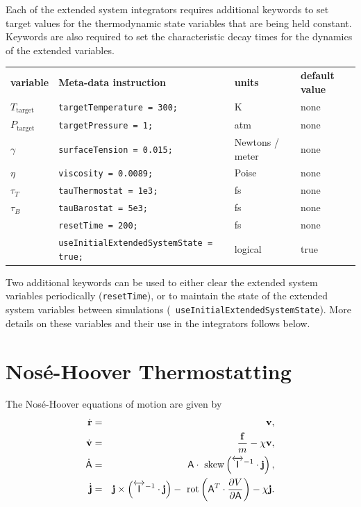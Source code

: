 \documentclass[letterpaper]{report}
\begin{document}
Each of the extended system integrators requires additional keywords
to set target values for the thermodynamic state variables that are
being held constant.  Keywords are also required to set the
characteristic decay times for the dynamics of the extended
variables.

\begin{center}
\begin{tabular}{llll}
{\bf variable} & {\bf Meta-data instruction} & {\bf units} & {\bf
default value} \\  
$T_{\mathrm{target}}$ & {\tt targetTemperature = 300;} &  K & none \\
$P_{\mathrm{target}}$ & {\tt targetPressure = 1;} & atm & none \\
$\gamma$ & {\tt surfaceTension = 0.015;} & Newtons / meter & none \\
$\eta$ & {\tt viscosity = 0.0089;} & Poise & none \\
$\tau_T$ & {\tt tauThermostat = 1e3;} & fs & none \\
$\tau_B$ & {\tt tauBarostat = 5e3;} & fs  & none \\
         & {\tt resetTime = 200;} & fs & none \\
         & {\tt useInitialExtendedSystemState = true;} & logical &
true
\end{tabular}
\end{center}

Two additional keywords can be used to either clear the extended
system variables periodically ({\tt resetTime}), or to maintain the
state of the extended system variables between simulations ({\tt
useInitialExtendedSystemState}).  More details on these variables
and their use in the integrators follows below.

\section{\label{section:noseHooverThermo}Nos\'{e}-Hoover Thermostatting}

The Nos\'e-Hoover equations of motion are given by\cite{Hoover85}
\begin{eqnarray}
\dot{{\bf r}} & = & {\bf v}, \\
\dot{{\bf v}} & = & \frac{{\bf f}}{m} - \chi {\bf v} ,\\
\dot{\mathsf{A}} & = & \mathsf{A} \cdot
\mbox{ skew}\left(\overleftrightarrow{\mathsf{I}}^{-1} \cdot {\bf j}\right), \\
\dot{{\bf j}} & = & {\bf j} \times \left( \overleftrightarrow{\mathsf{I}}^{-1}
\cdot {\bf j} \right) - \mbox{ rot}\left(\mathsf{A}^{T} \cdot \frac{\partial
V}{\partial \mathsf{A}} \right) - \chi {\bf j}.
\label{eq:nosehoovereom}
\end{eqnarray}
\end{document}
